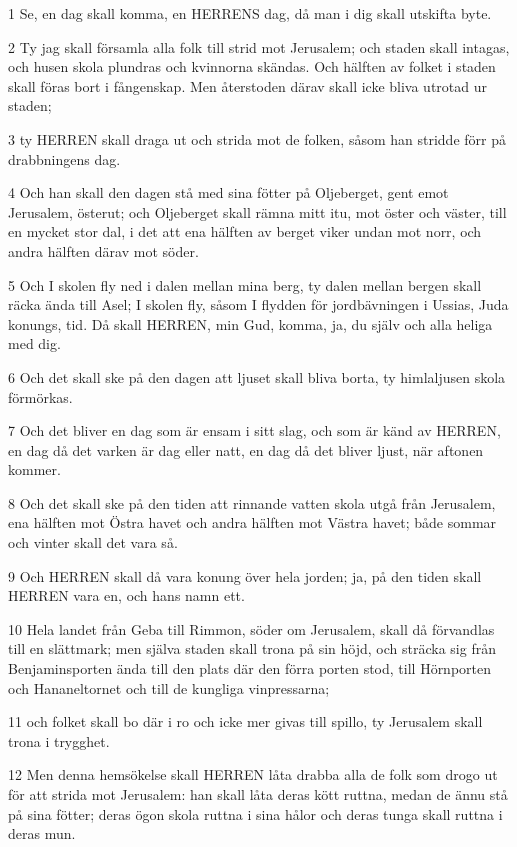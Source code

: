 \par 1 Se, en dag skall komma, en HERRENS dag, då man i dig skall utskifta byte.
\par 2 Ty jag skall församla alla folk till strid mot Jerusalem; och staden skall intagas, och husen skola plundras och kvinnorna skändas. Och hälften av folket i staden skall föras bort i fångenskap. Men återstoden därav skall icke bliva utrotad ur staden;
\par 3 ty HERREN skall draga ut och strida mot de folken, såsom han stridde förr på drabbningens dag.
\par 4 Och han skall den dagen stå med sina fötter på Oljeberget, gent emot Jerusalem, österut; och Oljeberget skall rämna mitt itu, mot öster och väster, till en mycket stor dal, i det att ena hälften av berget viker undan mot norr, och andra hälften därav mot söder.
\par 5 Och I skolen fly ned i dalen mellan mina berg, ty dalen mellan bergen skall räcka ända till Asel; I skolen fly, såsom I flydden för jordbävningen i Ussias, Juda konungs, tid. Då skall HERREN, min Gud, komma, ja, du själv och alla heliga med dig.
\par 6 Och det skall ske på den dagen att ljuset skall bliva borta, ty himlaljusen skola förmörkas.
\par 7 Och det bliver en dag som är ensam i sitt slag, och som är känd av HERREN, en dag då det varken är dag eller natt, en dag då det bliver ljust, när aftonen kommer.
\par 8 Och det skall ske på den tiden att rinnande vatten skola utgå från Jerusalem, ena hälften mot Östra havet och andra hälften mot Västra havet; både sommar och vinter skall det vara så.
\par 9 Och HERREN skall då vara konung över hela jorden; ja, på den tiden skall HERREN vara en, och hans namn ett.
\par 10 Hela landet från Geba till Rimmon, söder om Jerusalem, skall då förvandlas till en slättmark; men själva staden skall trona på sin höjd, och sträcka sig från Benjaminsporten ända till den plats där den förra porten stod, till Hörnporten och Hananeltornet och till de kungliga vinpressarna;
\par 11 och folket skall bo där i ro och icke mer givas till spillo, ty Jerusalem skall trona i trygghet.
\par 12 Men denna hemsökelse skall HERREN låta drabba alla de folk som drogo ut för att strida mot Jerusalem: han skall låta deras kött ruttna, medan de ännu stå på sina fötter; deras ögon skola ruttna i sina hålor och deras tunga skall ruttna i deras mun.

